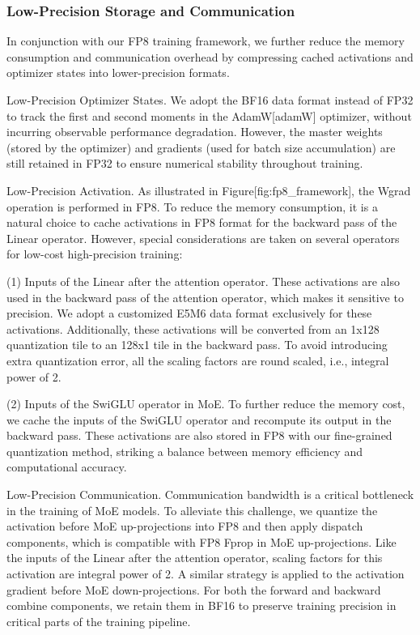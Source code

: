 \documentclass[11pt,a4paper]{article}
\begin{document}
\subsubsection{Low-Precision Storage and Communication}

In conjunction with our FP8 training framework, we further reduce the memory consumption and communication overhead by compressing cached activations and optimizer states into lower-precision formats.

Low-Precision Optimizer States. We adopt the BF16 data format instead of FP32 to track the first and second moments in the AdamW[adamW] optimizer, without incurring observable performance degradation. However, the master weights (stored by the optimizer) and gradients (used for batch size accumulation) are still retained in FP32 to ensure numerical stability throughout training.

Low-Precision Activation. As illustrated in Figure[fig:fp8\_framework], the Wgrad operation is performed in FP8. To reduce the memory consumption, it is a natural choice to cache activations in FP8 format for the backward pass of the Linear operator. However, special considerations are taken on several operators for low-cost high-precision training:

(1) Inputs of the Linear after the attention operator. These activations are also used in the backward pass of the attention operator, which makes it sensitive to precision. We adopt a customized E5M6 data format exclusively for these activations. Additionally, these activations will be converted from an 1x128 quantization tile to an 128x1 tile in the backward pass. To avoid introducing extra quantization error, all the scaling factors are round scaled, i.e., integral power of 2.

(2) Inputs of the SwiGLU operator in MoE. To further reduce the memory cost, we cache the inputs of the SwiGLU operator and recompute its output in the backward pass. These activations are also stored in FP8 with our fine-grained quantization method, striking a balance between memory efficiency and computational accuracy.

Low-Precision Communication. Communication bandwidth is a critical bottleneck in the training of MoE models. To alleviate this challenge, we quantize the activation before MoE up-projections into FP8 and then apply dispatch components, which is compatible with FP8 Fprop in MoE up-projections. Like the inputs of the Linear after the attention operator, scaling factors for this activation are integral power of 2. A similar strategy is applied to the activation gradient before MoE down-projections. For both the forward and backward combine components, we retain them in BF16 to preserve training precision in critical parts of the training pipeline.
\end{document}
